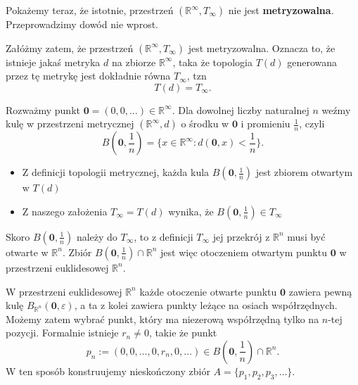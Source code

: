 \begin{eg}[1.2.2.]
\noindent Pokażemy teraz, że istotnie, przestrzeń $\left( \mathbb{R}^{\infty}, T_{\infty} \right) $ nie jest \textbf{metryzowalna}. Przeprowadzimy  dowód nie wprost. 

Załóżmy zatem, że przestrzeń $\left( \mathbb{R}^{\infty}, T_{\infty} \right) $ jest metryzowalna. Oznacza to, że istnieje jakaś metryka $d$ na zbiorze $\mathbb{R}^{\infty}$, taka że topologia $T\left( d \right) $ generowana przez tę metrykę jest dokładnie równa $T_{\infty}$, tzn
\[
T\left( d \right) = T_{\infty}
.\] 

Rozważmy punkt $\mathbf{0} = \left( 0,0,\ldots \right) \in \mathbb{R}^{\infty}$. Dla dowolnej liczby naturalnej $n$ weźmy kulę w przestrzeni metrycznej $\left( \mathbb{R}^{\infty},d \right) $ o środku w $\mathbf{0}$ i promieniu $\frac{1}{n}$, czyli 
\[
B\left( \mathbf{0}, \frac{1}{n} \right) = \{x \in \mathbb{R}^{\infty} : d\left( \mathbf{0}, x \right) < \frac{1}{n}\} 
.\] 
\begin{itemize}
	\item Z definicji topologii metrycznej, każda kula $B\left( \mathbf{0}, \frac{1}{n} \right) $ jest zbiorem otwartym w $T\left( d \right) $ 
	\item Z naszego założenia $T_{\infty} = T\left( d \right) $ wynika, że $B\left( \mathbf{0}, \frac{1}{n} \right) \in T_{\infty}$
\end{itemize}
Skoro $B\left( \mathbf{0}, \frac{1}{n} \right) $ należy do $T_{\infty}$, to z definicji $T_{\infty}$ jej przekrój z $\mathbb{R}^{n}$ musi być otwarte w $\mathbb{R}^{n}$. Zbiór $B\left( \mathbf{0},\frac{1}{n} \right) \cap \mathbb{R}^{n}$ jest więc otoczeniem otwartym punktu $\mathbf{0}$ w przestrzeni euklidesowej $\mathbb{R}^{n}$.

W przestrzeni euklidesowej $\mathbb{R}^{n}$ każde otoczenie otwarte punktu $\mathbf{0}$ zawiera pewną kulę $B_{\mathbb{R}^{n}}\left( \mathbf{0}, \varepsilon  \right) $, a ta z kolei zawiera punkty leżące na osiach współrzędnych. Możemy zatem wybrać punkt, który ma niezerową współrzędną tylko na $n$-tej pozycji. Formalnie istnieje $r_{n} \neq 0$, takie że punkt
\[
p_{n} := \left( 0,0,\ldots,0, r_{n},0,\ldots \right) \in B\left( \mathbf{0},\frac{1}{n} \right) \cap \mathbb{R}^{n}
.\] 
W ten sposób konstruujemy nieskończony zbiór $A = \{p_1,p_2,p_3,\ldots\} $.


\end{eg}
